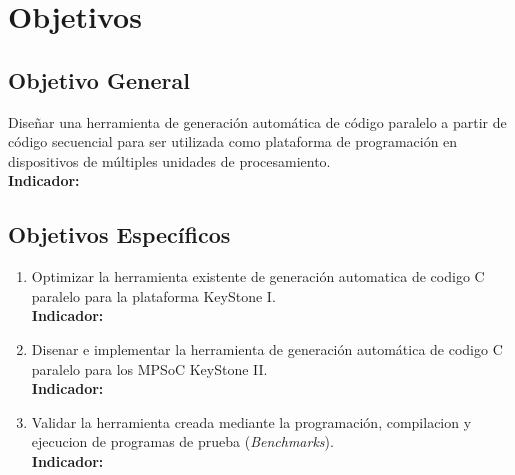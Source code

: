 
\chapter{Objetivos}
\label{ch:Objetivos}

\section{Objetivo General}

Diseñar una herramienta de generación automática de código paralelo a partir de código secuencial para ser utilizada
como plataforma de programación en dispositivos de múltiples unidades de procesamiento.\\
\textbf{Indicador:}


\section{Objetivos Específicos}
\begin{enumerate}
 \item Optimizar la herramienta existente de generación automatica de codigo C paralelo para la plataforma KeyStone I.\\
 \textbf{Indicador:}
 
 \item Disenar e implementar la herramienta de generación automática de codigo C paralelo para los MPSoC KeyStone II.\\
 \textbf{Indicador:}
 
 \item Validar la herramienta creada mediante la programación, compilacion y ejecucion de programas de prueba (\textit{Benchmarks}).\\
 \textbf{Indicador:}
\end{enumerate}
